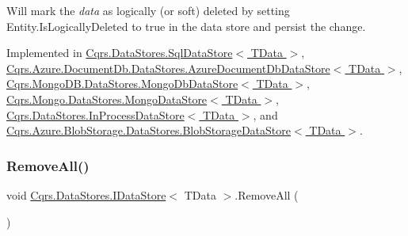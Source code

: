 Will mark the {\itshape data}  as logically (or soft) deleted by setting Entity.\+Is\+Logically\+Deleted to true in the data store and persist the change. 



Implemented in \hyperlink{classCqrs_1_1DataStores_1_1SqlDataStore_a898d15db199f054865a96ac646bf54fb_a898d15db199f054865a96ac646bf54fb}{Cqrs.\+Data\+Stores.\+Sql\+Data\+Store$<$ T\+Data $>$}, \hyperlink{classCqrs_1_1Azure_1_1DocumentDb_1_1DataStores_1_1AzureDocumentDbDataStore_abf9bcf75e8e0e1ec86155bf4da1a7b7a_abf9bcf75e8e0e1ec86155bf4da1a7b7a}{Cqrs.\+Azure.\+Document\+Db.\+Data\+Stores.\+Azure\+Document\+Db\+Data\+Store$<$ T\+Data $>$}, \hyperlink{classCqrs_1_1MongoDB_1_1DataStores_1_1MongoDbDataStore_a14b43546e8d1e1832358e1cf2f8535f1_a14b43546e8d1e1832358e1cf2f8535f1}{Cqrs.\+Mongo\+D\+B.\+Data\+Stores.\+Mongo\+Db\+Data\+Store$<$ T\+Data $>$}, \hyperlink{classCqrs_1_1Mongo_1_1DataStores_1_1MongoDataStore_a64003d01de3ac6ffd0e41bb7f572bf96_a64003d01de3ac6ffd0e41bb7f572bf96}{Cqrs.\+Mongo.\+Data\+Stores.\+Mongo\+Data\+Store$<$ T\+Data $>$}, \hyperlink{classCqrs_1_1DataStores_1_1InProcessDataStore_a43a93c614a403181e0641106ca9509d6_a43a93c614a403181e0641106ca9509d6}{Cqrs.\+Data\+Stores.\+In\+Process\+Data\+Store$<$ T\+Data $>$}, and \hyperlink{classCqrs_1_1Azure_1_1BlobStorage_1_1DataStores_1_1BlobStorageDataStore_af054d4134671d66981c4d91df5c1d481_af054d4134671d66981c4d91df5c1d481}{Cqrs.\+Azure.\+Blob\+Storage.\+Data\+Stores.\+Blob\+Storage\+Data\+Store$<$ T\+Data $>$}.

\mbox{\label{interfaceCqrs_1_1DataStores_1_1IDataStore_aead8d7a39a717d29af05daf7b64bea94_aead8d7a39a717d29af05daf7b64bea94}} 
\subsubsection{\texorpdfstring{Remove\+All()}{RemoveAll()}}
{\footnotesize\ttfamily void \hyperlink{interfaceCqrs_1_1DataStores_1_1IDataStore}{Cqrs.\+Data\+Stores.\+I\+Data\+Store}$<$ T\+Data $>$.Remove\+All (\begin{DoxyParamCaption}{ }\end{DoxyParamCaption})}



